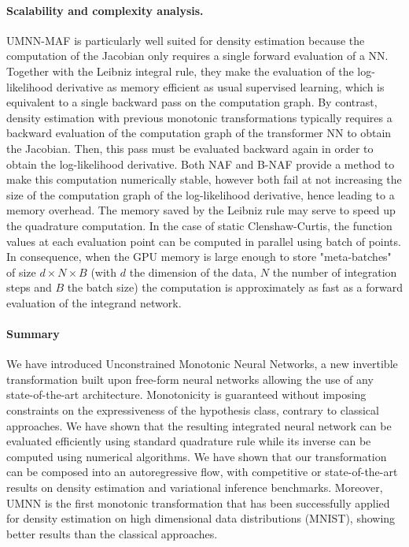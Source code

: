 \documentclass{article}
\begin{document}
\paragraph{Scalability and complexity analysis.}
UMNN-MAF is particularly well suited for density estimation because the computation of the Jacobian only requires a single forward evaluation of a NN. Together with the Leibniz integral rule, they make the evaluation of the log-likelihood derivative as memory efficient as usual supervised learning, which is equivalent to a single backward pass on the computation graph. By contrast, density estimation with previous monotonic transformations typically requires a backward evaluation of the computation graph of the transformer NN to obtain the Jacobian. Then, this pass must be evaluated backward again in order to obtain the log-likelihood derivative. Both NAF and B-NAF provide a method to make this computation numerically stable, however both fail at not increasing the size of the computation graph of the log-likelihood derivative, hence leading to a memory overhead. The memory saved by the Leibniz rule may serve to speed up the quadrature computation. In the case of static Clenshaw-Curtis, the function values at each evaluation point can be computed in parallel using batch of points. In consequence, when the GPU memory is large enough to store "meta-batches" of size $d\times N \times B$ (with $d$ the dimension of the data, $N$ the number of integration steps and $B$ the batch size) the computation is approximately as fast as a forward evaluation of the integrand network.


\paragraph{Summary}
We have introduced Unconstrained Monotonic Neural Networks, a new invertible transformation built upon free-form neural networks allowing the use of any state-of-the-art architecture. Monotonicity is guaranteed without imposing constraints on the expressiveness of the hypothesis class, contrary to classical approaches.
We have shown that the resulting integrated neural network can be evaluated efficiently using standard quadrature rule while its inverse can be computed using numerical algorithms.
We have shown that our transformation can be composed into an autoregressive flow, with competitive or state-of-the-art results on density estimation and variational inference benchmarks. Moreover, UMNN is the first monotonic transformation that has been successfully applied for density estimation on high dimensional data distributions (MNIST), showing better results than the classical approaches.
\end{document}
